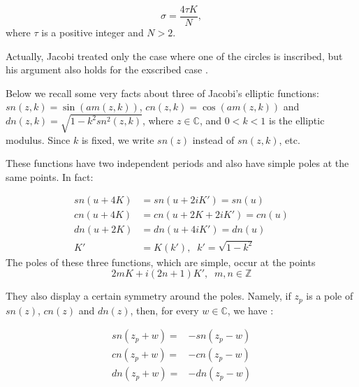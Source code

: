 \[ \sigma=\frac{4\tau K}{N},\]
where $\tau$ is a positive integer and $N>2$.

Actually, Jacobi treated only the case where one of the circles is inscribed, but his argument also holds for the exscribed case \cite{bos-1987}.

Below we recall some very facts about three of Jacobi's elliptic functions: $sn(z,k)=\sin{(am(z,k))}$, $cn(z,k)=\cos(am(z,k))$ and $dn(z,k)=\sqrt{1-k^2sn^2(z,k)}$, where $z \in \mathbb{C}$, and $0<k<1$ is the elliptic modulus. Since $k$ is fixed, we write $sn(z)$ instead of $sn(z,k)$, etc.

These functions have two independent periods and also have simple poles at the same points. In fact:

\begin{align*}
    sn(u+4K)&=sn(u+2iK')=sn(u)\\
    cn(u+4K)&=cn(u+2K+2iK')=cn(u)\\
    dn(u+2K)&=dn(u+4iK')=dn(u)\\
    K'&=K(k'), \;\;k'=\sqrt{1-k^2}
\end{align*}
The  poles of these three functions, which are simple, occur at the points
\[2mK+i(2n+1)K'
,\;\; m,n\in \mathbb{Z}\]

They also display a certain symmetry around the poles. Namely, if $z_p$ is a pole of $sn(z)$, $cn(z)$ and $dn(z)$, then, for every $w \in \mathbb{C}$, we have \cite[Chapter 2]{armitage-2006}:

\begin{align}
sn(z_p+w)=&-sn(z_p-w) \nonumber \\
cn(z_p+w)=&-cn(z_p-w)  \label{eqn:zpole} \\
dn(z_p+w)=&-dn(z_p-w) \nonumber
\end{align}

 